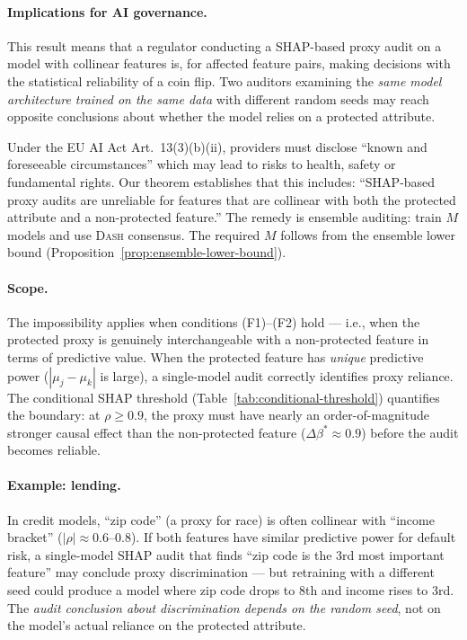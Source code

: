 \documentclass{article}
\newcommand{\DASH}{\textsc{Dash}}
\begin{document}
\paragraph{Implications for AI governance.}
This result means that a regulator conducting a SHAP-based proxy
audit on a model with collinear features is, for affected feature pairs,
making decisions with the statistical reliability of a coin flip.
Two auditors examining the \emph{same model architecture trained on the
same data} with different random seeds may reach opposite conclusions
about whether the model relies on a protected attribute.

Under the EU AI Act Art.~13(3)(b)(ii), providers must disclose
``known and foreseeable circumstances'' which may lead to risks to health, safety or fundamental rights. Our
theorem establishes that this includes: ``SHAP-based proxy audits are
unreliable for features that are collinear with both the protected
attribute and a non-protected feature.'' The remedy is ensemble
auditing: train $M$ models and use \DASH{} consensus. The required
$M$ follows from the ensemble lower bound
(Proposition~\ref{prop:ensemble-lower-bound}).

\paragraph{Scope.}
The impossibility applies when conditions (F1)--(F2) hold ---
i.e., when the protected proxy is genuinely interchangeable with a
non-protected feature in terms of predictive value. When the
protected feature has \emph{unique} predictive power
($|\mu_j - \mu_k|$ is large), a single-model audit correctly
identifies proxy reliance. The conditional SHAP threshold
(Table~\ref{tab:conditional-threshold}) quantifies the boundary:
at $\rho \geq 0.9$, the proxy must have nearly an order-of-magnitude
stronger causal effect than the non-protected feature ($\Delta\beta^*
\approx 0.9$) before the audit becomes reliable.

\paragraph{Example: lending.}
In credit models, ``zip code'' (a proxy for race) is often collinear
with ``income bracket'' ($|\rho| \approx 0.6$--$0.8$). If both
features have similar predictive power for default risk, a
single-model SHAP audit that finds ``zip code is the 3rd most
important feature'' may conclude proxy discrimination --- but
retraining with a different seed could produce a model where
zip code drops to 8th and income rises to 3rd. The \emph{audit
conclusion about discrimination depends on the random seed},
not on the model's actual reliance on the protected attribute.
\end{document}
